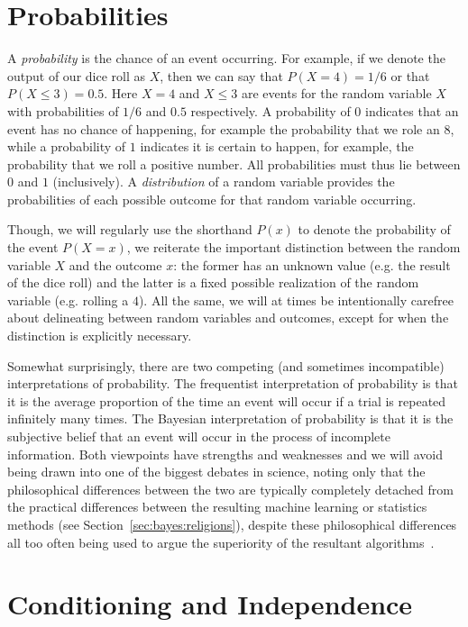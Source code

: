 \section{Probabilities}
\label{sec:prob:prob}

A \emph{probability} is
the chance of an event occurring.  For example, if we denote the output
of our dice roll as $X$, then we can say that $P(X=4) = 1/6$ or that $P(X\le3) = 0.5$.  Here
$X=4$ and $X\le3$ are events for the random variable $X$ with probabilities of $1/6$ and $0.5$
respectively.   A probability of $0$ indicates that an event has no chance of happening, 
for example the probability that we role an $8$, while
a probability of $1$ indicates it is certain to happen, for example, the probability 
that we roll a positive number.  All probabilities must thus lie between $0$ and $1$ 
(inclusively).  
A \emph{distribution} of a random variable provides the probabilities of each possible 
outcome for that random variable occurring.

Though, we will regularly use the shorthand $P(x)$ to denote the probability of the 
event $P(X=x)$,
we reiterate the important distinction between the random variable $X$ and the outcome $x$:
the former has an unknown value (e.g. the result of the dice roll) and the latter is
a fixed possible realization of the random variable (e.g. rolling a $4$).
All the same, we will at times be intentionally carefree about delineating between
random variables and outcomes, except for when the distinction is explicitly necessary.

Somewhat surprisingly, there are two competing (and sometimes incompatible)
interpretations of probability.  The frequentist interpretation of
probability is that it is the average proportion of the time an event will occur if a trial is 
repeated infinitely many times.  The Bayesian interpretation of probability is that it is the subjective
belief that an event will occur in the process of incomplete information.  Both viewpoints have
strengths and weaknesses and we will avoid being drawn into one of the biggest debates in
science, noting only that the philosophical differences between the two are typically completely
detached from the practical differences between the resulting machine learning or statistics
methods (see Section~\ref{sec:bayes:religions}), despite these philosophical differences all too 
often being used to argue the superiority of the resultant algorithms~\citep{gelman2011induction,steinhardt2012beyond}.

\section{Conditioning and Independence}
\label{sec:prob:cond}

